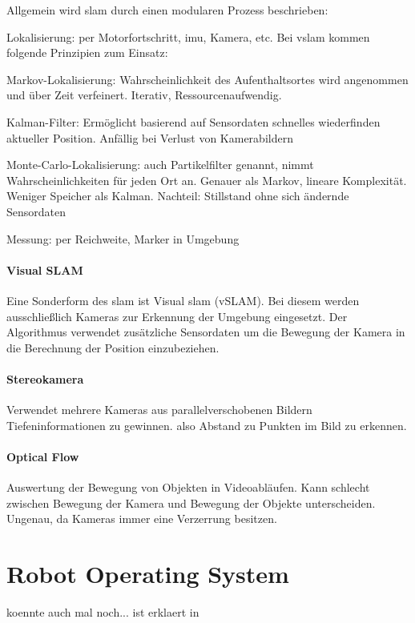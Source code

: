 Allgemein wird \gls{slam} durch einen modularen Prozess beschrieben: \begin{compactdesc}
    \item[Lokalisierung:] per Motorfortschritt, \gls{imu}, Kamera, etc.\newline
    Bei v\gls{slam} kommen folgende Prinzipien zum Einsatz:
\end{compactdesc}
\begin{compactitem}
    \item Markov-Lokalisierung: Wahrscheinlichkeit des Aufenthaltsortes wird angenommen und über Zeit verfeinert. Iterativ, Ressourcenaufwendig.
	\item Kalman-Filter: Ermöglicht basierend auf Sensordaten schnelles wiederfinden aktueller Position. Anfällig bei Verlust von Kamerabildern
	\item Monte-Carlo-Lokalisierung: auch Partikelfilter genannt, nimmt Wahrscheinlichkeiten für jeden Ort an. Genauer als Markov, lineare Komplexität. Weniger Speicher als Kalman. Nachteil: Stillstand ohne sich ändernde Sensordaten
\end{compactitem}
\begin{compactdesc}
    \item[Messung:] per Reichweite, Marker in Umgebung
\end{compactdesc}

\paragraph*{Visual SLAM} 
Eine Sonderform des \gls{slam} ist Visual \gls{slam} (vSLAM). Bei diesem werden ausschließlich Kameras zur Erkennung der Umgebung eingesetzt. Der Algorithmus verwendet zusätzliche Sensordaten um die Bewegung der Kamera in die Berechnung der Position einzubeziehen.

\paragraph*{Stereokamera}\label{chap:stereovision}
Verwendet mehrere Kameras aus parallelverschobenen Bildern Tiefeninformationen zu gewinnen. also Abstand zu Punkten im Bild zu erkennen.
\paragraph*{Optical Flow}
Auswertung der Bewegung von Objekten in Videoabläufen. Kann schlecht zwischen Bewegung der Kamera und Bewegung der Objekte unterscheiden. Ungenau, da Kameras immer eine Verzerrung besitzen. 

\section{Robot Operating System}
koennte auch mal noch... ist erklaert in \cite[Kapitel 2.2]{wirthErweiterungBestehendenDrohne2022a}